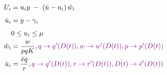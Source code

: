 \documentclass[10pt]{article}
\begin{document}
\begin{align*}
U_i &= u_i y \;-\;(\bar{u}-u_i)\,\tilde{w}_i  \\[4pt] 
 \dot{u}_i &= y - \gamma_i   \\[4pt]
& 0 \le u_i \le \mu  \\
\tilde{w}_i &=\frac{w}{pqK}, \textcolor{violet}{q \rightarrow q'(D(t)), w \rightarrow w'(D(t)) , p \rightarrow p'(D(t))} \\
 \bar{u}_i &=\frac{\bar{e}q}{r},\textcolor{violet}{q \rightarrow q'(D(t)),r \rightarrow r'(D(t)),  \bar{D(t)} \rightarrow \bar{e}'(D(t))} \\ 
\end{align*}
\end{document}
